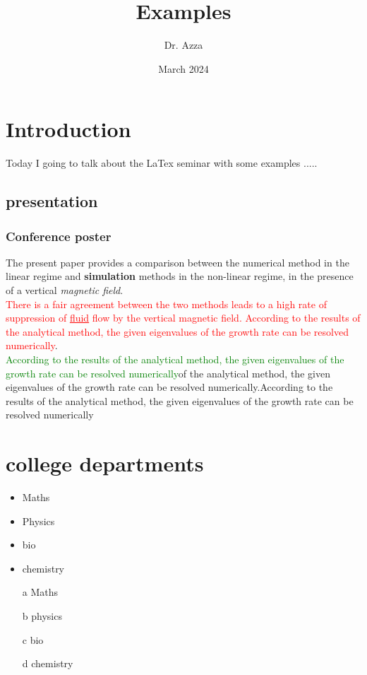 \documentclass[16pt]{article}
\title{Examples}
\author{Dr. Azza }
\date{March 2024}
\begin{document}
\maketitle

\section{Introduction}

Today I going to talk about the LaTex seminar with some examples .....
\subsection{presentation}
\subsubsection{Conference poster}
The present paper provides a comparison between the numerical method in the linear regime and \textbf{simulation} methods in
the non-linear regime, in the presence of a vertical \textit{magnetic field}.\\


\textcolor{red}{There is a fair agreement between the two methods leads to a high rate of suppression of \underline{fluid} flow by the vertical magnetic field. According to the results of the analytical method, the given eigenvalues of the growth rate can be resolved numerically}.\\


\textcolor{green}{According to the results of the analytical method, the given eigenvalues of the growth rate can be resolved numerically}\huge of the analytical method, the given eigenvalues of the growth rate can be resolved numerically.\normalsize According to the results of the analytical method, the given eigenvalues of the growth rate can be resolved numerically


\section{college departments}
\begin{itemize}
    \item Maths
    \item Physics
    \item bio
    \item chemistry
\end{itemize}
\begin{enumerate}
    \item [a]Maths
    \item [b]physics
    \item [c]bio
    \item [d]chemistry
\end{enumerate}
\end{document}

